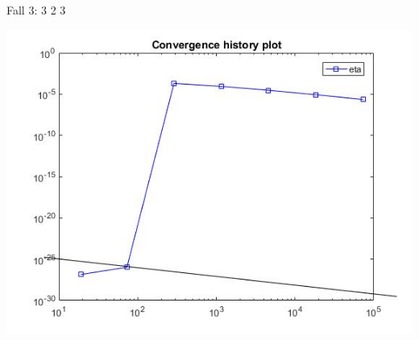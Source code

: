 \documentclass[xcolor=svgnames,ngerman]{beamer}
\begin{document}
				\begin{frame}{Fall 3: 3 2 3}
\begin{center}
	\includegraphics[scale=0.3]{323.jpg}
\end{center}
	\end{frame}	
\end{document}
